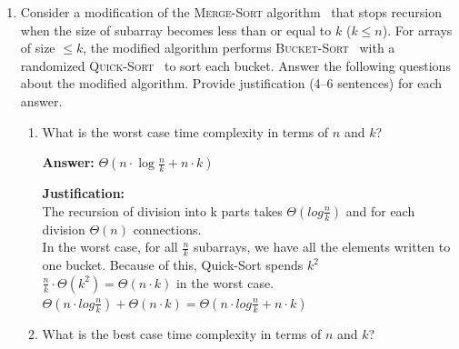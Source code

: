\documentclass[dvipsnames]{article}
\begin{document}
\begin{enumerate}
\begin{enumerate}
      \color{blue}
      \textbf{Answer:}
        \begin{itemize}
            \item Since in (b) we calculated that it takes $\Theta(1)$ to write each element, then for all elements - $\Theta(n)$.
            \item Since, according to our algorithm, each coordinate is in one bucket, sorting each element takes $\Theta(1)$. Then for all coordinates it will be $\Theta(n)$.
             \item Writing our bucket into a new sorted array also takes $\Theta(n)$
             \item The result: $\Theta(n+n+n) = \Theta(n)$
        \end{itemize}
      \color{black}
    \end{enumerate}

  \item Consider a modification of the \textsc{Merge-Sort} algorithm~\cite[\S 2.3]{Cormen2022}
  that stops recursion when the size of subarray becomes less than or equal to $k$ ($k \leq n$).
  For arrays of size $\leq k$, the modified algorithm performs \textsc{Bucket-Sort}~\cite[\S 8.4]{Cormen2022}
  with a randomized \textsc{Quick-Sort}~\cite[\S 7.3]{Cormen2022} to sort each bucket.
  Answer the following questions about the modified algorithm. Provide justification (4--6 sentences) for each answer.
    \begin{enumerate}
      \item What is the worst case time complexity in terms of $n$ and $k$?

      \color{blue}
      \textbf{Answer:}
      $\Theta(n \cdot \log \frac{n}{k} + n \cdot k)$

      \textbf{Justification:}\\
      The recursion of division into k parts takes $\Theta(log \frac{n}{k})$ and for each division $\Theta(n)$ connections.\\
        In the worst case, for all $\frac{n}{k}$ subarrays, we have all the elements written to one bucket. Because of this, Quick-Sort spends $k^2$\\
        $\frac{n}{k} \cdot \Theta(k^2) =\Theta( n \cdot k)$ in the worst case.\\
        $\Theta(n \cdot log \frac{n}{k}) + \Theta(n \cdot k)=\Theta(n \cdot log \frac{n}{k} + n \cdot k)$
      \color{black}

      \item What is the best case time complexity in terms of $n$ and $k$?


\end{enumerate}
\end{enumerate}
\end{document}
